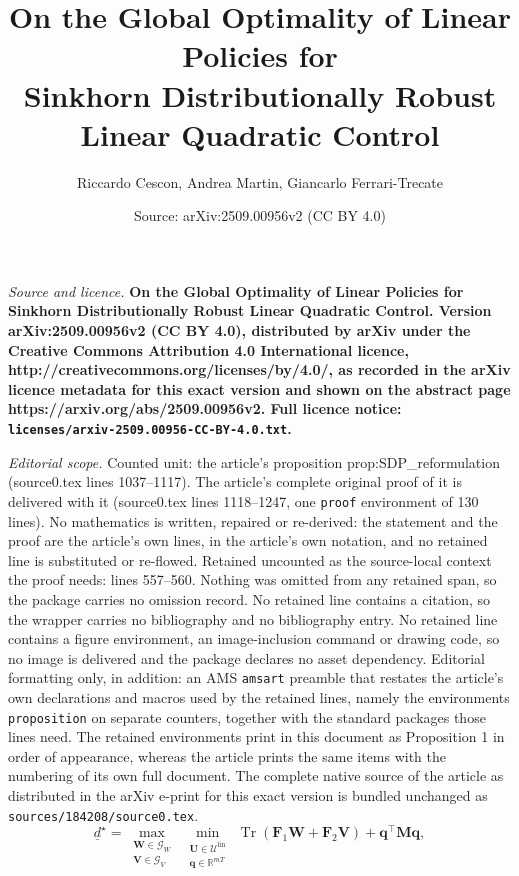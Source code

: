 \documentclass[10pt,a4paper]{amsart}
\title{\LARGE \bf On the Global Optimality of Linear Policies for \\Sinkhorn Distributionally Robust Linear Quadratic Control}
\author{Riccardo Cescon, Andrea Martin, Giancarlo Ferrari-Trecate}
\date{Source: arXiv:2509.00956v2 (CC BY 4.0)}
\newcommand{\R}{\mathbb{R}}
\DeclareMathOperator{\Tr}{Tr}
\begin{document}
\maketitle

\noindent\emph{Source and licence.} \LARGE \bf On the Global Optimality of Linear Policies for \\Sinkhorn Distributionally Robust Linear Quadratic Control. Version arXiv:2509.00956v2 (CC BY 4.0), distributed by arXiv under the Creative Commons Attribution 4.0 International licence, http://creativecommons.org/licenses/by/4.0/, as recorded in the arXiv licence metadata for this exact version and shown on the abstract page https://arxiv.org/abs/2509.00956v2. Full licence notice: \texttt{licenses/arxiv-2509.00956-CC-BY-4.0.txt}.\par\smallskip

\noindent\textit{Editorial scope.} Counted unit: the article's proposition prop:SDP\_reformulation (source0.tex lines 1037--1117). The article's complete original proof of it is delivered with it (source0.tex lines 1118--1247, one \texttt{proof} environment of 130 lines). No mathematics is written, repaired or re-derived: the statement and the proof are the article's own lines, in the article's own notation, and no retained line is substituted or re-flowed.  Retained uncounted as the source-local context the proof needs: lines 557--560.  Nothing was omitted from any retained span, so the package carries no omission record.  No retained line contains a citation, so the wrapper carries no bibliography and no bibliography entry.  No retained line contains a figure environment, an image-inclusion command or drawing code, so no image is delivered and the package declares no asset dependency.  Editorial formatting only, in addition: an AMS \texttt{amsart} preamble that restates the article's own declarations and macros used by the retained lines, namely the environments \texttt{proposition} on separate counters, together with the standard packages those lines need.  The retained environments print in this document as Proposition 1 in order of appearance, whereas the article prints the same items with the numbering of its own full document.  The complete native source of the article as distributed in the arXiv e-print for this exact version is bundled unchanged as \texttt{sources/184208/source0.tex}.
\begin{equation}
\label{eq:trace_lowerbound}
    \underline{d}^\star = \max _{\substack{\mathbf{W}\in\mathcal{G}_W\\ \mathbf{V}\in\mathcal{G}_V}}\ \min _{\substack{\mathbf{U}\in\mathcal{U}^{\text{lin}}\\ \mathbf{q}\in\R^{mT}}}\ \Tr\left(\mathbf{F}_{1} \mathbf{W}+\mathbf{F}_{2} \mathbf{V}\right)+\mathbf{q}^{\top} \mathbf{M} \mathbf{q},
    \end{equation}
\end{document}
